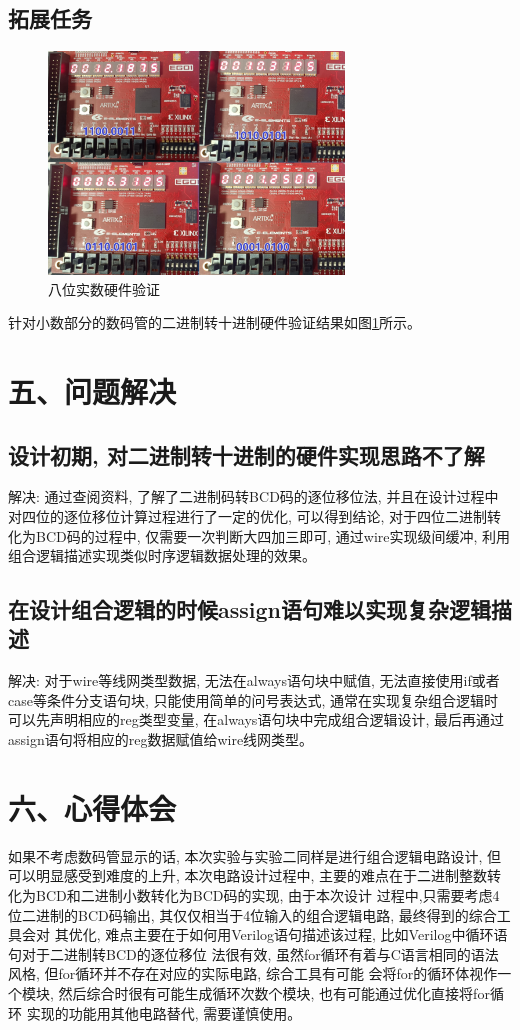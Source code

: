 \documentclass{article}
\newcommand{\fourhao}{\fontsize{14pt}{\baselineskip}\selectfont} %
\newcommand{\xiaosihao}{\fontsize{12pt}{\baselineskip}\selectfont} %
\begin{document}
\subsection*{拓展任务}
\begin{figure}[H]
    \centering
    \includegraphics[width=0.7\textwidth]{image/2024-06-16-22-29-35.png}
    \caption{八位实数硬件验证}
    \label{image_real_hardware}
\end{figure}
针对小数部分的数码管的二进制转十进制硬件验证结果如图\ref{image_real_hardware}所示。
\section*{\fourhao 五、问题解决}
\xiaosihao
{}
\subsection*{设计初期, 对二进制转十进制的硬件实现思路不了解}
解决: 通过查阅资料, 了解了二进制码转BCD码的逐位移位法, 并且在设计过程中对四位的逐位移位计算过程进行了一定的优化, 可以得到结论, 
对于四位二进制转化为BCD码的过程中, 仅需要一次判断大四加三即可, 通过wire实现级间缓冲, 利用组合逻辑描述实现类似时序逻辑数据处理的效果。
\subsection*{在设计组合逻辑的时候assign语句难以实现复杂逻辑描述}
解决: 对于wire等线网类型数据, 无法在always语句块中赋值, 无法直接使用if或者case等条件分支语句块, 只能使用简单的问号表达式, 
通常在实现复杂组合逻辑时可以先声明相应的reg类型变量, 在always语句块中完成组合逻辑设计, 最后再通过assign语句将相应的reg数据赋值给wire线网类型。
\section*{\fourhao 六、心得体会}
\xiaosihao
如果不考虑数码管显示的话, 本次实验与实验二同样是进行组合逻辑电路设计, 但可以明显感受到难度的上升, 
本次电路设计过程中, 主要的难点在于二进制整数转化为BCD和二进制小数转化为BCD码的实现, 由于本次设计
过程中,只需要考虑4位二进制的BCD码输出, 其仅仅相当于4位输入的组合逻辑电路, 最终得到的综合工具会对
其优化, 难点主要在于如何用Verilog语句描述该过程, 比如Verilog中循环语句对于二进制转BCD的逐位移位
法很有效, 虽然for循环有着与C语言相同的语法风格, 但for循环并不存在对应的实际电路, 综合工具有可能
会将for的循环体视作一个模块, 然后综合时很有可能生成循环次数个模块, 也有可能通过优化直接将for循环
实现的功能用其他电路替代, 需要谨慎使用。
\end{document}
